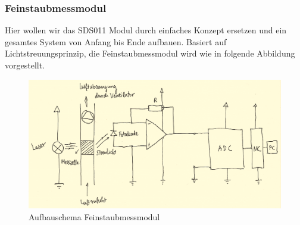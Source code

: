 \documentclass[12pt]{article}
\begin{document}
\subsubsection{Feinstaubmessmodul}
Hier wollen wir das SDS011 Modul durch einfaches Konzept ersetzen und ein gesamtes System von Anfang bis Ende aufbauen. Basiert auf Lichtstreuungsprinzip, die Feinstaubmessmodul wird wie in folgende Abbildung vorgestellt.

\begin{figure}[h!]
  \centering
  \label{fig:ftmm}
  \includegraphics[width=\textwidth]{feinstaubschaltungneu2}
  \caption{Aufbauschema Feinstaubmessmodul}
\end{figure}
\end{document}
